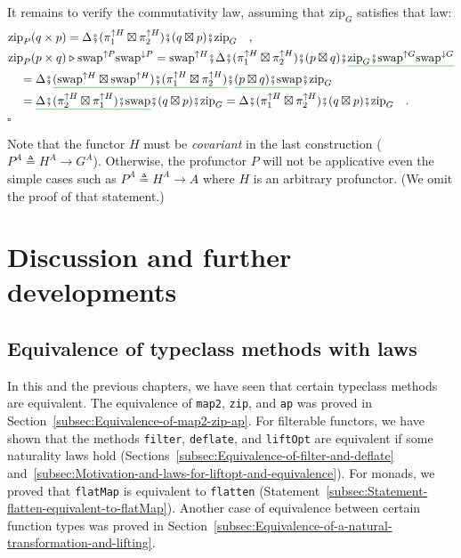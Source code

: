It remains to verify the commutativity law, assuming that $\text{zip}_{G}$
satisfies that law:
\begin{align*}
 & \text{zip}_{P}(q\times p)=\Delta\bef(\pi_{1}^{\uparrow H}\boxtimes\pi_{2}^{\uparrow H})\bef(q\boxtimes p)\bef\text{zip}_{G}\quad,\\
 & \text{zip}_{P}(p\times q)\triangleright\text{swap}^{\uparrow P}\text{swap}^{\downarrow P}=\text{swap}^{\uparrow H}\bef\Delta\bef(\pi_{1}^{\uparrow H}\boxtimes\pi_{2}^{\uparrow H})\bef(p\boxtimes q)\bef\gunderline{\text{zip}_{G}\bef\text{swap}^{\uparrow G}\text{swap}^{\downarrow G}}\\
 & \quad=\Delta\bef\gunderline{(\text{swap}^{\uparrow H}\boxtimes\text{swap}^{\uparrow H})\bef(\pi_{1}^{\uparrow H}\boxtimes\pi_{2}^{\uparrow H})}\bef\gunderline{(p\boxtimes q)\bef\text{swap}}\bef\text{zip}_{G}\\
 & \quad=\gunderline{\Delta\bef(\pi_{2}^{\uparrow H}\boxtimes\pi_{1}^{\uparrow H})\bef\text{swap}}\bef(q\boxtimes p)\bef\text{zip}_{G}=\Delta\bef(\pi_{1}^{\uparrow H}\boxtimes\pi_{2}^{\uparrow H})\bef(q\boxtimes p)\bef\text{zip}_{G}\quad.
\end{align*}
$\square$

Note that the functor $H$ must be \emph{covariant} in the last construction
($P^{A}\triangleq H^{A}\rightarrow G^{A}$). Otherwise, the profunctor
$P$ will not be applicative even the simple cases such as $P^{A}\triangleq H^{A}\rightarrow A$
where $H$ is an arbitrary profunctor. (We omit the proof of that
statement.)

\section{Discussion and further developments}

\subsection{Equivalence of typeclass methods with laws}

In this and the previous chapters, we have seen that certain typeclass
methods are equivalent. The equivalence of \lstinline!map2!, \lstinline!zip!,
and \lstinline!ap! was proved in Section~\ref{subsec:Equivalence-of-map2-zip-ap}.
For filterable functors, we have shown that the methods \lstinline!filter!,
\lstinline!deflate!, and \lstinline!liftOpt! are equivalent if some
naturality laws hold (Sections~\ref{subsec:Equivalence-of-filter-and-deflate}
and~\ref{subsec:Motivation-and-laws-for-liftopt-and-equivalence}).
For monads, we proved that \lstinline!flatMap! is equivalent to \lstinline!flatten!
(Statement~\ref{subsec:Statement-flatten-equivalent-to-flatMap}).
Another case of equivalence between certain function types was proved
in Section~\ref{subsec:Equivalence-of-a-natural-transformation-and-lifting}. 

